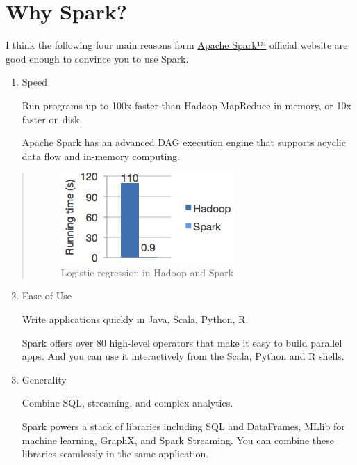 \documentclass[letterpaper,11pt,english]{sphinxmanual}
\begin{document}
\section{Why Spark?}
\label{why:why-spark}
I think the following four main reasons form \href{http://spark.apache.org/}{Apache Spark™} official website are good enough
to convince you to use Spark.
\begin{enumerate}
\item {} 
Speed

Run programs up to 100x faster than Hadoop MapReduce in memory, or 10x faster on disk.

Apache Spark has an advanced DAG execution engine that supports acyclic data flow and in-memory computing.

\end{enumerate}
\begin{quote}
\begin{figure}[htbp]
\centering
\capstart

\includegraphics{logistic-regression.png}
\caption{Logistic regression in Hadoop and Spark}\label{why:fig-lr}\end{figure}
\end{quote}
\begin{enumerate}
\setcounter{enumi}{1}
\item {} 
Ease of Use

Write applications quickly in Java, Scala, Python, R.

Spark offers over 80 high-level operators that make it easy to build parallel apps. And you can use it interactively from the Scala, Python and R shells.

\item {} 
Generality

Combine SQL, streaming, and complex analytics.

Spark powers a stack of libraries including SQL and DataFrames, MLlib for machine learning, GraphX, and Spark Streaming. You can combine these libraries seamlessly in the same application.

\end{enumerate}
\end{document}
